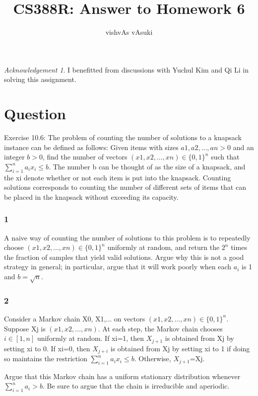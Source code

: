 \documentclass[10pt]{amsart}
\title{CS388R: Answer to Homework 6}
\author{vishvAs vAsuki}
\theoremstyle{remark}
\newtheorem*{ack}{Acknowledgement}
\begin{document}
\maketitle

\begin{ack}
I benefitted from discussions with Yuchul Kim and Qi Li in solving this assignment.
\end{ack}


\section{Question}
Exercise 10.6: The problem of counting the number of solutions to a knapsack instance can be defined as follows: Given items with sizes $a1, a2,\dots, an>0$ and an integer $b> 0$, find the number of vectors $(x1, x2,\dots, xn)\in\{0, 1\}^{n}$ such that $\sum_{i=1}^{n}a_{i}x_{i}\leq b$. The number b can be thought of as the size of a knapsack, and the xi denote whether or not each item is put into the knapsack. Counting solutions corresponds to counting the number of different sets of items that can be placed in the knapsack without exceeding its capacity.

\subsubsection{1} A naive way of counting the number of solutions to this problem is to repeatedly choose $(x1, x2,\dots, xn)\in\{0, 1\}^{n}$ uniformly at random, and return the $2^{n}$ times the fraction of samples that yield valid solutions. Argue why this is not a good strategy in general; in particular, argue that it will work poorly when each $a_{i}$ is 1 and $b=\sqrt{n}$.

\subsubsection{2}

Consider a Markov chain X0, X1,... on vectors $(x1, x2,\dots, xn)\in\{0, 1\}^{n}$. Suppose Xj is $(x1, x2,\dots, xn)$. At each step, the Markov chain chooses $i\in[1, n]$ uniformly at random. If xi=1, then $X_{j+1}$ is obtained from Xj by setting xi to 0. If xi=0, then $X_{j+i}$ is obtained from Xj by setting xi to 1 if doing so maintains the restriction $\sum_{i=1}^{n}a_{i}x_{i}\leq b$. Otherwise, $X_{j+1}$=Xj.

Argue that this Markov chain has a uniform stationary distribution whenever $\sum_{i=1}^{n}a_{i}> b$. Be sure to argue that the chain is irreducible and aperiodic.
\end{document}
